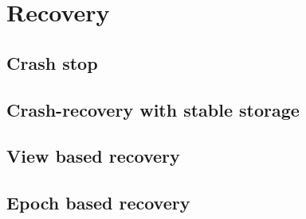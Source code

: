\chapter{Recovery}

\section{Crash stop}
\label{sec:crash_stop}

\section{Crash-recovery with stable storage}
\label{sec:full_ss}

\section{View based recovery}
\label{sec:view_ss}

\section{Epoch based recovery}
\label{sec:epoch_ss}
